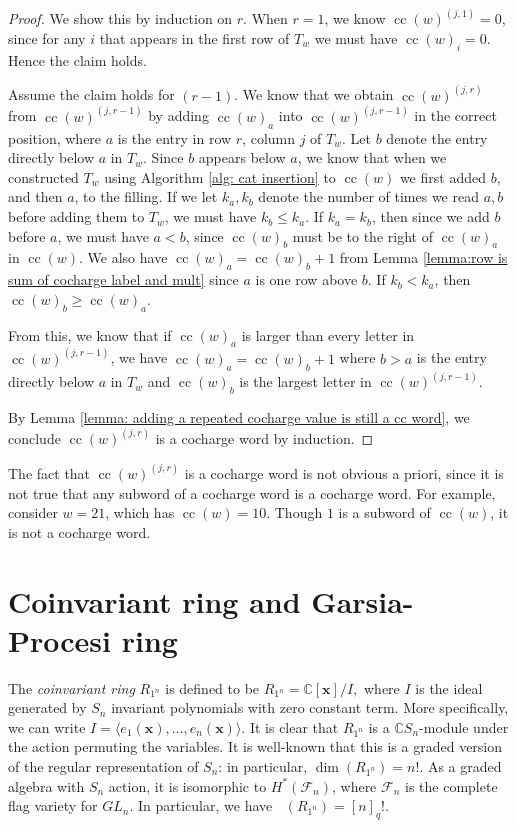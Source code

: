 \documentclass[ALCO, Unicode]{cedram}
\DeclareMathOperator{\Hilb}{Hilb}
\DeclareMathOperator{\cc}{cc}
\DeclareMathOperator{\Hilbq}{\Hilb_q}
\begin{document}
\begin{proof}
    We show this by induction on $r$. When $r=1$, we know $\cc(w)^{(j,1)} = 0$, since for any $i$ that appears in the first row of $T_w$ we must have $\cc(w)_i = 0$. Hence the claim holds.

    Assume the claim holds for $(r-1)$. We know that we obtain $\cc(w)^{(j,r)}$ from $\cc(w)^{(j,r-1)}$ by adding $\cc(w)_a$ into $\cc(w)^{(j,r-1)}$ in the correct position, where $a$ is the entry in row $r$, column $j$ of $T_w$.
    Let $b$ denote the entry directly below $a$ in $T_w$.
    Since $b$ appears below $a$, we know that when we constructed $T_w$ using Algorithm \ref{alg: cat insertion} to $\cc(w)$ we first added $b$, and then $a$, to the filling.
    If we let $k_a, k_b$ denote the number of times we read $a,b$ before adding them to $T_w$, we must have $k_b \leq  k_a$.
    If $k_a = k_b$, then since we add $b$ before $a$, we must have $a<b$, since $\cc(w)_b$ must be to the right of $\cc(w)_a$ in $\cc(w)$. We also have $\cc(w)_{a} = \cc(w)_{b} + 1$ from Lemma \ref{lemma:row is sum of cocharge label and mult} since $a$ is one row above $b$.  If $k_b < k_a$, then $\cc(w)_{b} \geq  \cc(w)_{a}$. 
    
    From this, we know that if $\cc(w)_a$ is larger than every letter in $\cc(w)^{(j,r-1)}$, we have $\cc(w)_a = \cc(w)_b+1$ where $b>a$ is the entry directly below $a$ in $T_w$ and $\cc(w)_b$ is the largest letter in $\cc(w)^{(j,r-1)}$.

     By Lemma \ref{lemma: adding a repeated cocharge value is still a cc word}, we conclude $\cc(w)^{(j,r)}$ is a cocharge word by induction.
\end{proof}

\begin{rema}
    The fact that $\cc(w)^{(j,r)}$ is a cocharge word is not obvious a priori, since it is not true that any subword of a cocharge word is a cocharge word. For example, consider $w = 21 $, which has $\cc(w) =10.$ Though $1$ is a subword of $\cc(w)$, it is not a cocharge word.
\end{rema}

\section{Coinvariant ring and Garsia-Procesi ring}\label{section: coinvariant ring and garsia procesi}

The \textit{coinvariant ring} $R_{1^n}$ is defined to be  $R_{1^n}= \mathbb{C}[\mathbf{x}]/ I,$ where $I$ is the ideal generated by $S_n$ invariant polynomials with zero constant term. More specifically, we can write $I = \langle e_1(\mathbf{x}),\dots, e_n(\mathbf{x})\rangle$.
It is clear that $R_{1^n}$ is a $\mathbb{C}S_n$-module under the action permuting the variables. 
It is well-known that this is a graded version of the regular representation of $S_n$: in particular, $\dim(R_{1^n}) = n!$. As a graded algebra with $S_n$ action, it is isomorphic to $H^{\ast}(\mathcal{F}_n)$, where $\mathcal{F}_n$ is the complete flag variety for $GL_n$. In particular, we have $\Hilbq(R_{1^n}) =[n]_q!$.
\end{document}
